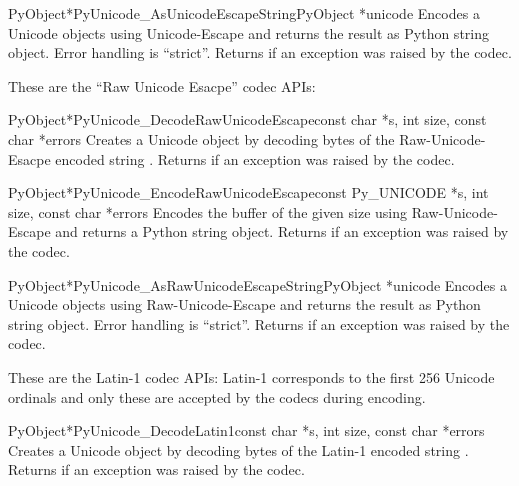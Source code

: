 \begin{cfuncdesc}{PyObject*}{PyUnicode_AsUnicodeEscapeString}{PyObject *unicode}
  Encodes a Unicode objects using Unicode-Escape and returns the
  result as Python string object.  Error handling is ``strict''.
  Returns \NULL{} if an exception was raised by the codec.
\end{cfuncdesc}


These are the ``Raw Unicode Esacpe'' codec APIs:

\begin{cfuncdesc}{PyObject*}{PyUnicode_DecodeRawUnicodeEscape}{const char *s,
                                               int size,
                                               const char *errors}
  Creates a Unicode object by decoding  bytes of the
  Raw-Unicode-Esacpe encoded string .  Returns \NULL{} if an
  exception was raised by the codec.
\end{cfuncdesc}

\begin{cfuncdesc}{PyObject*}{PyUnicode_EncodeRawUnicodeEscape}{const Py_UNICODE *s,
                                               int size,
                                               const char *errors}
  Encodes the  buffer of the given size using
  Raw-Unicode-Escape and returns a Python string object.  Returns
  \NULL{} if an exception was raised by the codec.
\end{cfuncdesc}

\begin{cfuncdesc}{PyObject*}{PyUnicode_AsRawUnicodeEscapeString}{PyObject *unicode}
  Encodes a Unicode objects using Raw-Unicode-Escape and returns the
  result as Python string object. Error handling is ``strict''.
  Returns \NULL{} if an exception was raised by the codec.
\end{cfuncdesc}


These are the Latin-1 codec APIs:
Latin-1 corresponds to the first 256 Unicode ordinals and only these
are accepted by the codecs during encoding.

\begin{cfuncdesc}{PyObject*}{PyUnicode_DecodeLatin1}{const char *s,
                                                     int size,
                                                     const char *errors}
  Creates a Unicode object by decoding  bytes of the Latin-1
  encoded string .  Returns \NULL{} if an exception was raised
  by the codec.
\end{cfuncdesc}

